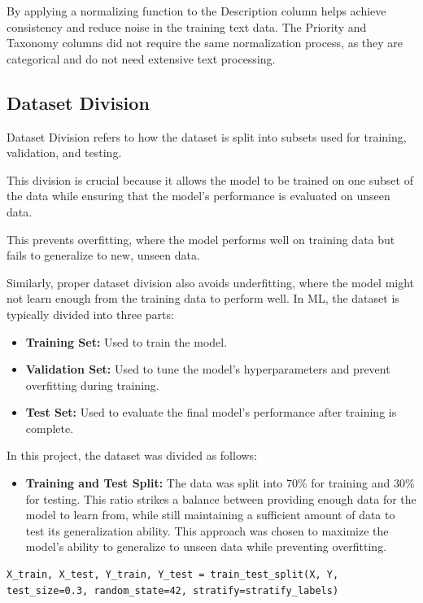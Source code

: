 By applying a normalizing function to the Description column helps achieve consistency and reduce noise in the training text data.
The Priority and Taxonomy columns did not require the same normalization process, as they are categorical and do not need extensive text processing.

\subsection{Dataset Division}
Dataset Division refers to how the dataset is split into subsets used for training, validation, and testing. 

This division is crucial because it allows the model to be trained on one subset of the data while ensuring that the model's performance is evaluated on unseen data. 

This prevents overfitting, where the model performs well on training data but fails to generalize to new, unseen data. 

Similarly, proper dataset division also avoids underfitting, where the model might not learn enough from the training data to perform well.
\clearpage
In ML, the dataset is typically divided into three parts:
\begin{itemize}
    \item \textbf{Training Set:} Used to train the model.
    \item \textbf{Validation Set:} Used to tune the model's hyperparameters and prevent overfitting during training.
    \item \textbf{Test Set:} Used to evaluate the final model's performance after training is complete.
\end{itemize}

In this project, the dataset was divided as follows:

\begin{itemize}
    \item \textbf{Training and Test Split:} The data was split into 70\% for training and 30\% for testing. This ratio strikes a balance between providing enough data for the model to learn from, while still maintaining a sufficient amount of data to test its generalization ability. This approach was chosen to maximize the model's ability to generalize to unseen data while preventing overfitting.
\end{itemize}

\vspace{0.2cm}
\noindent
\begin{minipage}{\linewidth}
\begin{verbatim}
X_train, X_test, Y_train, Y_test = train_test_split(X, Y, test_size=0.3, random_state=42, stratify=stratify_labels)
\end{verbatim}
\label{lst:dataset_split}
\end{minipage}
\vspace{0.1cm}


